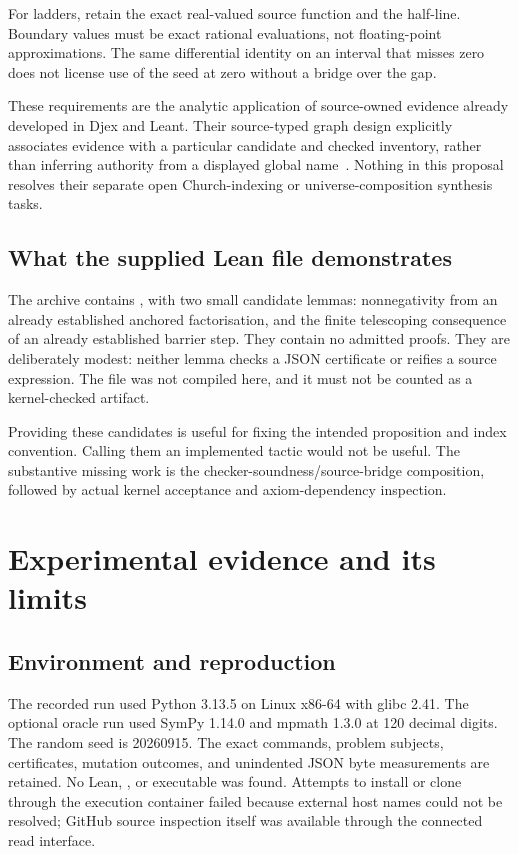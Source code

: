 \documentclass[11pt,a4paper]{article}
\theoremstyle{definition}\newtheorem{definition}[theorem]{Definition}
\newcommand{\code}[1]{\texttt{\detokenize{#1}}}
\begin{document}
For ladders, retain the exact real-valued source function and the half-line.
Boundary values must be exact rational evaluations, not floating-point
approximations. The same differential identity on an interval that misses zero
does not license use of the seed at zero without a bridge over the gap.

These requirements are the analytic application of source-owned evidence
already developed in Djex and Leant. Their source-typed graph design explicitly
associates evidence with a particular candidate and checked inventory, rather
than inferring authority from a displayed global name~\cite{djex-graphs}.
Nothing in this proposal resolves their separate open Church-indexing or
universe-composition synthesis tasks.

\subsection{What the supplied Lean file demonstrates}

The archive contains \code{lean/SemanticBridges.lean}, with two small candidate
lemmas: nonnegativity from an already established anchored factorisation, and
the finite telescoping consequence of an already established barrier step.
They contain no admitted proofs. They are deliberately modest: neither lemma
checks a JSON certificate or reifies a source expression. The file was not
compiled here, and it must not be counted as a kernel-checked artifact.

Providing these candidates is useful for fixing the intended proposition and
index convention. Calling them an implemented tactic would not be useful. The
substantive missing work is the checker-soundness/source-bridge composition,
followed by actual kernel acceptance and axiom-dependency inspection.

\section{Experimental evidence and its limits}
\label{sec:experiments}

\subsection{Environment and reproduction}

The recorded run used Python 3.13.5 on Linux x86-64 with glibc 2.41. The optional
oracle run used SymPy 1.14.0 and mpmath 1.3.0 at 120 decimal digits. The random
seed is 20260915. The exact commands, problem subjects, certificates, mutation
outcomes, and unindented JSON byte measurements are retained. No Lean,
\code{lake}, or \code{elan} executable was found. Attempts to install or clone
through the execution container failed because external host names could not
be resolved; GitHub source inspection itself was available through the connected
read interface.
\end{document}
